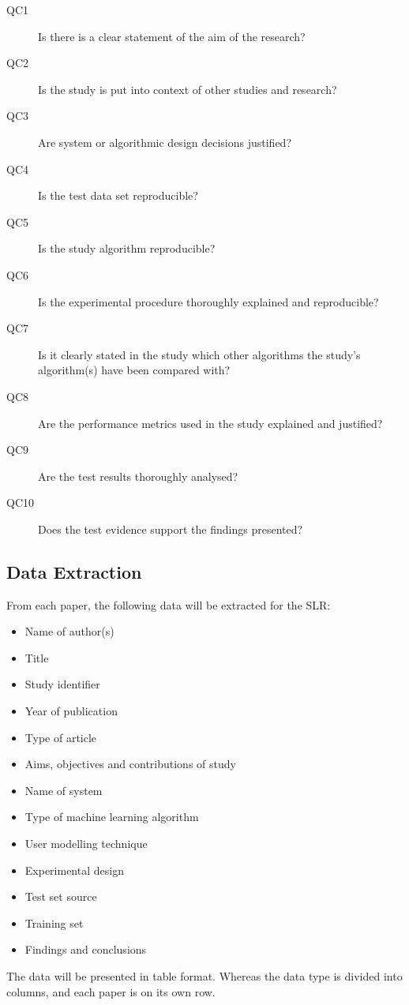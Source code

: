 \begin{description}

\item[QC1] Is there is a clear statement of the aim of the research?
\item[QC2] Is the study is put into context of other studies and research?
\item[QC3] Are system or algorithmic design decisions justified?
\item[QC4] Is the test data set reproducible?
\item[QC5] Is the study algorithm reproducible?
\item[QC6] Is the experimental procedure thoroughly explained and reproducible?
\item[QC7] Is it clearly stated in the study which other algorithms the study's algorithm(s) have been compared with?
\item[QC8] Are the performance metrics used in the study explained and justified?
\item[QC9] Are the test results thoroughly analysed?
\item[QC10] Does the test evidence support the findings presented?

\end{description}

\subsection{Data Extraction}

From each paper, the following data will be extracted for the SLR:

\begin{itemize}

\item Name of author(s) 
\item Title
\item Study identifier
\item Year of publication 
\item Type of article
\item Aims, objectives and contributions of study
\item Name of system
\item Type of machine learning algorithm
\item User modelling technique
\item Experimental design
\item Test set source
\item Training set
\item Findings and conclusions

\end{itemize}

The data will be presented in table format. Whereas the data type is divided into columns, and each paper is on its own row.